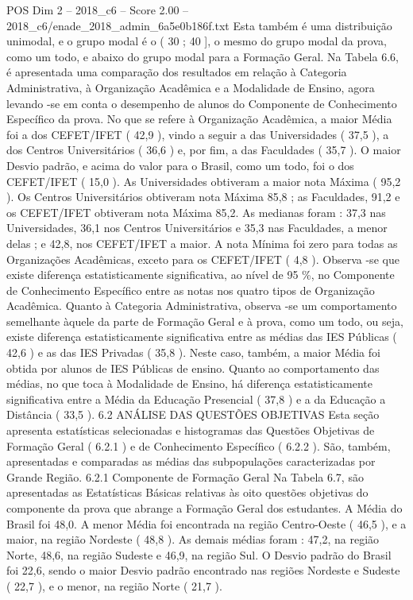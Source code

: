 \begin{textsample}{POS Dim 2 – 2018\_c6 – Score 2.00 – 2018\_c6/enade\_2018\_admin\_6a5e0b186f.txt}
Esta também é uma distribuição unimodal, e o grupo modal é o ( 30 ; 40 ], o mesmo do grupo modal da prova, como um todo, e abaixo do grupo modal para a Formação Geral.
Na Tabela 6.6, é apresentada uma comparação dos resultados em relação à Categoria Administrativa, à Organização Acadêmica e a Modalidade de Ensino, agora levando -se em conta o desempenho de alunos do Componente de Conhecimento Específico da prova.
No que se refere à Organização Acadêmica, a maior Média foi a dos CEFET/IFET ( 42,9 ), vindo a seguir a das Universidades ( 37,5 ), a dos Centros Universitários ( 36,6 ) e, por fim, a das Faculdades ( 35,7 ).
O maior Desvio padrão, e acima do valor para o Brasil, como um todo, foi o dos CEFET/IFET ( 15,0 ).
As Universidades obtiveram a maior nota Máxima ( 95,2 ).
Os Centros Universitários obtiveram nota Máxima 85,8 ; as Faculdades, 91,2 e os CEFET/IFET obtiveram nota Máxima 85,2.
As medianas foram : 37,3 nas Universidades, 36,1 nos Centros Universitários e 35,3 nas Faculdades, a menor delas ; e 42,8, nos CEFET/IFET a maior.
A nota Mínima foi zero para todas as Organizações Acadêmicas, exceto para os CEFET/IFET ( 4,8 ).
Observa -se que existe diferença estatisticamente significativa, ao nível de 95 \%, no Componente de Conhecimento Específico entre as notas nos quatro tipos de Organização Acadêmica.
Quanto à Categoria Administrativa, observa -se um comportamento semelhante àquele da parte de Formação Geral e à prova, como um todo, ou seja, existe diferença estatisticamente significativa entre as médias das IES Públicas ( 42,6 ) e as das IES Privadas ( 35,8 ).
Neste caso, também, a maior Média foi obtida por alunos de IES Públicas de ensino.
Quanto ao comportamento das médias, no que toca à Modalidade de Ensino, há diferença estatisticamente significativa entre a Média da Educação Presencial ( 37,8 ) e a da Educação a Distância ( 33,5 ). 6.2 ANÁLISE DAS QUESTÕES OBJETIVAS Esta seção apresenta estatísticas selecionadas e histogramas das Questões Objetivas de Formação Geral ( 6.2.1 ) e de Conhecimento Específico ( 6.2.2 ).
São, também, apresentadas e comparadas as médias das subpopulações caracterizadas por Grande Região. 6.2.1 Componente de Formação Geral Na Tabela 6.7, são apresentadas as Estatísticas Básicas relativas às oito questões objetivas do componente da prova que abrange a Formação Geral dos estudantes.
A Média do Brasil foi 48,0.
A menor Média foi encontrada na região Centro-Oeste ( 46,5 ), e a maior, na região Nordeste ( 48,8 ).
As demais médias foram : 47,2, na região Norte, 48,6, na região Sudeste e 46,9, na região Sul.
O Desvio padrão do Brasil foi 22,6, sendo o maior Desvio padrão encontrado nas regiões Nordeste e Sudeste ( 22,7 ), e o menor, na região Norte ( 21,7 ).

\end{textsample}
